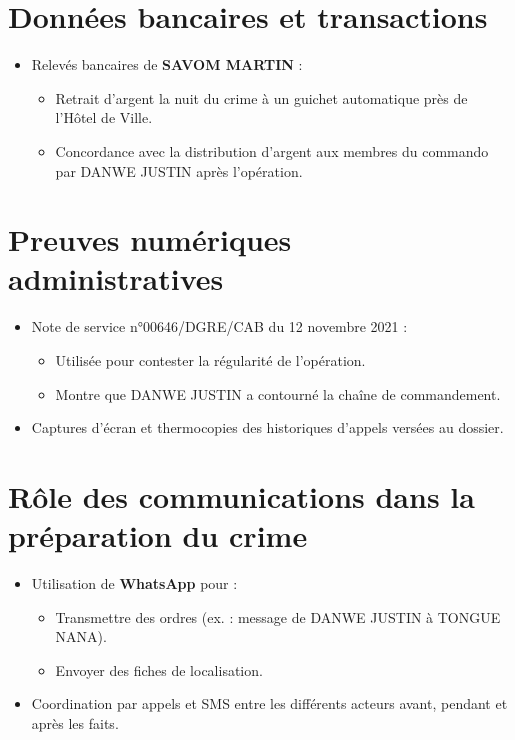 \documentclass[12pt, a4em]{article}
\begin{document}
	\section*{Données bancaires et transactions}
	\begin{itemize}[leftmargin=*]
		\item Relevés bancaires de \textbf{SAVOM MARTIN} :
		\begin{itemize}
			\item Retrait d'argent la nuit du crime à un guichet automatique près de l'Hôtel de Ville.
			\item Concordance avec la distribution d'argent aux membres du commando par DANWE JUSTIN après l'opération.
		\end{itemize}
	\end{itemize}
	
	\section*{Preuves numériques administratives}
	\begin{itemize}[leftmargin=*]
		\item Note de service n°00646/DGRE/CAB du 12 novembre 2021 :
		\begin{itemize}
			\item Utilisée pour contester la régularité de l'opération.
			\item Montre que DANWE JUSTIN a contourné la chaîne de commandement.
		\end{itemize}
		\item Captures d'écran et thermocopies des historiques d'appels versées au dossier.
	\end{itemize}
	
	\section*{Rôle des communications dans la préparation du crime}
	\begin{itemize}[leftmargin=*]
		\item Utilisation de \textbf{WhatsApp} pour :
		\begin{itemize}
			\item Transmettre des ordres (ex. : message de DANWE JUSTIN à TONGUE NANA).
			\item Envoyer des fiches de localisation.
		\end{itemize}
		\item Coordination par appels et SMS entre les différents acteurs avant, pendant et après les faits.
	\end{itemize}
	
\end{document}
